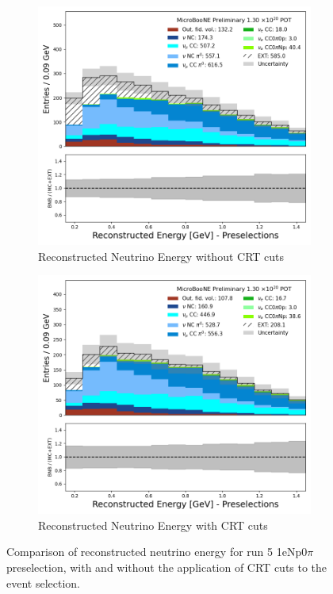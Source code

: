 \begin{figure}[H] \centering
    \begin{subfigure}[t]{0.45\linewidth}
        \includegraphics[width=\linewidth]{technote/EventSelections/FiguresCRT/run5_Np_presel.png}
        \caption{Reconstructed Neutrino Energy without CRT cuts}
    \end{subfigure}%
    \hspace{0.45cm}%
    \begin{subfigure}[t]{0.45\linewidth}
        \includegraphics[width=\linewidth]{technote/EventSelections/FiguresCRT/run5_Np_presel_crt.png}%
        \caption{Reconstructed Neutrino Energy with CRT cuts}
    \end{subfigure}%
    \caption{Comparison of reconstructed neutrino energy for run 5 1eNp0$\pi$ preselection, with and without the application of CRT cuts to the event selection.}
    \label{fig:1eNp_preselection}
\end{figure}

